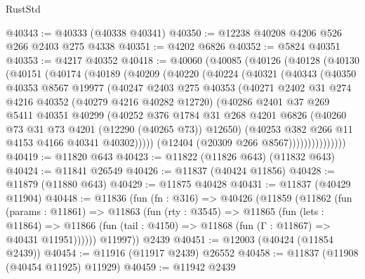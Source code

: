 \begin{lexlean}{RustStd}
\begin{coremodule}
{\begin{coremodule}
{{{{{{{{{{{{{{{{{{{{{{{{{{{{{{{{{{{{{{{{{{{{{{{{{{@40343 := @40333 (@40338 @40341)
@40350 := @12238 @40208 @4206 @526 @266 @2403 @275 @4338
@40351 := @4202 @6826
@40352 := @5824 @40351
@40353 := @4217 @40352
@40418 := @40060
    (@40085
      (@40126
        (@40128
          (@40130
            (@40151
              (@40174
                (@40189
                  (@40209
                    (@40220
                      (@40224
                        (@40321
                          (@40343
                            (@40350
                              @40353
                              @8567
                              @19977
                              (@40247
                                @2403
                                @275
                                @40353
                                (@40271
                                  @2402
                                  @31
                                  @274
                                  @4216
                                  @40352
                                  (@40279 @4216 @40282 @12720)
                                  (@40286
                                    @2401
                                    @37
                                    @269
                                    @5411
                                    @40351
                                    @40299
                                    (@40252
                                      @376
                                      @1784
                                      @31
                                      @268
                                      @4201
                                      @6826
                                      (@40260 @73 @31 @73 @4201 (@12290 (@40265 @73)) @12650)
                                      (@40253 @382 @266 @11 @4153 @4166 @40341 @40302)))))
                              (@12404 (@20309 @266 @8567)))))))))))))))
@40419 := @11820 @643
@40423 := @11822 (@11826 @643) (@11832 @643)
@40424 := @11841 @26549
@40426 := @11837 (@40424 @11856)
@40428 := @11879 (@11880 @643)
@40429 := @11875 @40428
@40431 := @11837 (@40429 @11904)
@40448 := @11836
    (fun (fn : @316) =>
    @40426
      (@11859
        (@11862
          (fun (params : @11861) =>
          @11863
            (fun (rty : @3545) =>
            @11865
              (fun (lets : @11864) =>
              @11866 (fun (tail : @4150) => @11868 (fun (Γ : @11867) => @40431 @11951))))))
        @11997))
    @2439
@40451 := @12003 (@40424 (@11854 @2439))
@40454 := @11916 (@11917 @2439) @26552
@40458 := @11837 (@11908 (@40454 @11925) @11929)
@40459 := @11942 @2439
}}}}}}}}}}}}}}}}}}}}}}}}}}}}}}}}}}}}}}}}}}}}}}}}}}
\end{coremodule}}
\end{coremodule}
\end{lexlean}
